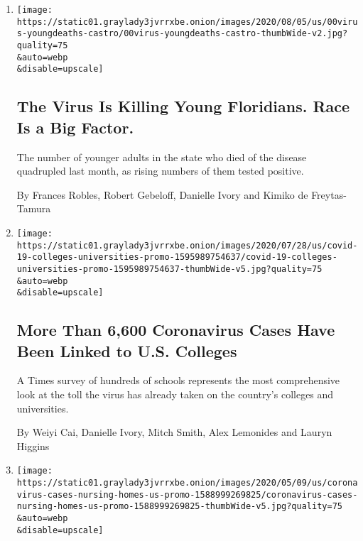 \begin{enumerate}
\def\labelenumi{\arabic{enumi}.}
\item
  \href{/2020/08/11/us/virus-young-deaths.html}{}

  \texttt{[image: https://static01.graylady3jvrrxbe.onion/images/2020/08/05/us/00virus-youngdeaths-castro/00virus-youngdeaths-castro-thumbWide-v2.jpg?quality=75\\\&auto=webp\\\&disable=upscale]}

  \hypertarget{the-virus-is-killing-young-floridians-race-is-a-big-factor}{%
  \subsection{The Virus Is Killing Young Floridians. Race Is a Big
  Factor.}\label{the-virus-is-killing-young-floridians-race-is-a-big-factor}}

  The number of younger adults in the state who died of the disease
  quadrupled last month, as rising numbers of them tested positive.

  By Frances Robles, Robert Gebeloff, Danielle Ivory and Kimiko de
  Freytas-Tamura
\item
  \href{/interactive/2020/07/28/us/covid-19-colleges-universities.html}{}

  \texttt{[image: https://static01.graylady3jvrrxbe.onion/images/2020/07/28/us/covid-19-colleges-universities-promo-1595989754637/covid-19-colleges-universities-promo-1595989754637-thumbWide-v5.jpg?quality=75\\\&auto=webp\\\&disable=upscale]}

  \hypertarget{more-than-6600-coronavirus-cases-have-been-linked-to-us-colleges}{%
  \subsection{More Than 6,600 Coronavirus Cases Have Been Linked to U.S.
  Colleges}\label{more-than-6600-coronavirus-cases-have-been-linked-to-us-colleges}}

  A Times survey of hundreds of schools represents the most
  comprehensive look at the toll the virus has already taken on the
  country's colleges and universities.

  By Weiyi Cai, Danielle Ivory, Mitch Smith, Alex Lemonides and Lauryn
  Higgins
\item
  \href{/interactive/2020/05/09/us/coronavirus-cases-nursing-homes-us.html}{}

  \texttt{[image: https://static01.graylady3jvrrxbe.onion/images/2020/05/09/us/coronavirus-cases-nursing-homes-us-promo-1588999269825/coronavirus-cases-nursing-homes-us-promo-1588999269825-thumbWide-v5.jpg?quality=75\\\&auto=webp\\\&disable=upscale]}


\end{enumerate}
